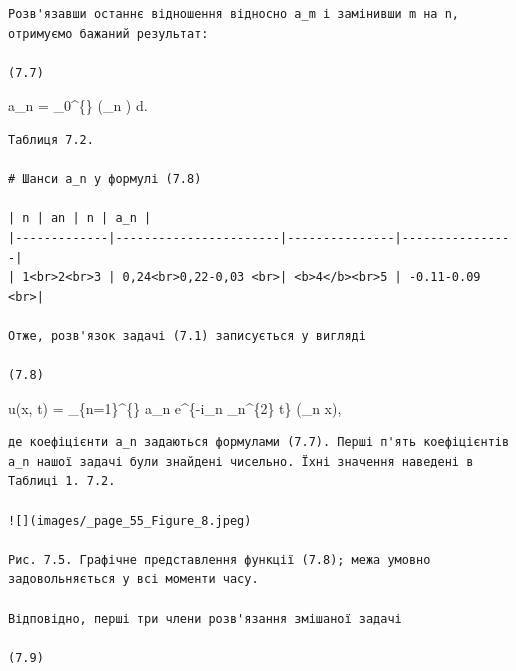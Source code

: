 \documentclass[
  ukrainian,
]{article}
\begin{document}
\begin{verbatim}
Розв'язавши останнє відношення відносно a_m і замінивши m на n, отримуємо бажаний результат:

(7.7)
\end{verbatim}

a\_n = 
\int\_0\^{}\{\infty\} \xi \sin (\lambda\_n \xi) d\xi.

\begin{verbatim}
Таблиця 7.2.

# Шанси a_n у формулі (7.8)

| n | an | n | a_n |
|-------------|-----------------------|---------------|----------------|
| 1<br>2<br>3 | 0,24<br>0,22-0,03 <br>| <b>4</b><br>5 | -0.11-0.09 <br>|

Отже, розв'язок задачі (7.1) записується у вигляді

(7.8)
\end{verbatim}

u(x, t) = \sum\_\{n=1\}\^{}\{\infty\} a\_n e\^{}\{-i\lambda\_n
\alpha\_n\^{}\{2\} t\} \sin(\lambda\_n x),

\begin{verbatim}
де коефіцієнти a_n задаються формулами (7.7). Перші п'ять коефіцієнтів a_n нашої задачі були знайдені чисельно. Їхні значення наведені в Таблиці 1. 7.2.

![](images/_page_55_Figure_8.jpeg)

Рис. 7.5. Графічне представлення функції (7.8); межа умовно задовольняється у всі моменти часу.

Відповідно, перші три члени розв'язання змішаної задачі

(7.9)
\end{verbatim}
\end{document}
